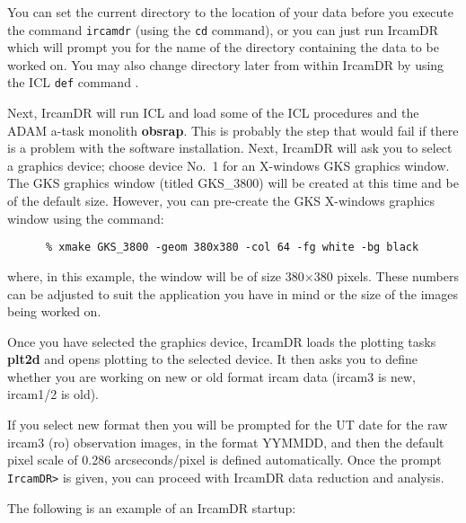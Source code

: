 You can set the current directory to the location of your data before
you execute the command {\tt ircamdr} (using the {\tt cd} command), or
you can just run {\sc IrcamDR} which will prompt you for the name of
the directory containing the data to be worked on.  You may also change
directory later from within {\sc IrcamDR} by using the ICL {\tt def}
command .

Next, {\sc IrcamDR} will run ICL and load some of the ICL procedures
and the {\sc ADAM} \mbox{a-task} monolith {\bf obsrap}.  This is
probably the step that would fail if there is a problem with the software
installation. Next, {\sc IrcamDR} will ask you to select a graphics
device; choose device No.\ 1 for an X-windows GKS graphics window.  The
GKS graphics window (titled GKS\_3800) will be created at this time and
be of the default size.  However, you can pre-create the GKS X-windows
graphics window using the command:

\begin{verbatim}
      % xmake GKS_3800 -geom 380x380 -col 64 -fg white -bg black
\end{verbatim}

where, in this example, the window will be of size 380$\times$380
pixels.  These numbers can be adjusted to suit the application you have
in mind or the size of the images being worked on.

Once you have selected the graphics device, {\sc IrcamDR} loads the
plotting tasks {\bf plt2d} and opens plotting to the selected device.
It then asks you to define whether you are working on new or old
format {\sc ircam} data ({\sc ircam3} is new, {\sc ircam1/2} is old).

If you select new format then you will be prompted for the UT date for
the raw {\sc ircam3} ({\sc ro}) observation images, in the format YYMMDD, and
then the default pixel scale of 0.286 arcseconds/pixel is defined
automatically.  Once the prompt \verb+IrcamDR>+ is given, you can
proceed with {\sc IrcamDR} data reduction and analysis.

The following is an example of an {\sc IrcamDR} startup:


